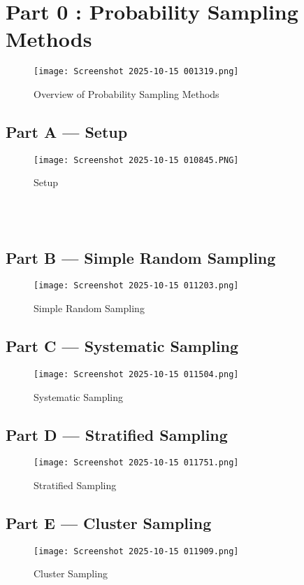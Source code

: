 \documentclass[12pt,a4paper]{article}
\begin{document}
\newpage
\section{Part 0 : Probability Sampling Methods}

\begin{figure}[H]
  \centering
  \texttt{[image: Screenshot 2025-10-15 001319.png]}
  \caption{Overview of Probability Sampling Methods}
  \label{fig:prob_sampling}
  \end{figure}


\subsection*{Part A --- Setup}
\begin{figure}[H]
  \centering
  \texttt{[image: Screenshot 2025-10-15 010845.PNG]}
  \caption{Setup}
\end{figure}


\\\\


\subsection*{Part B --- Simple Random Sampling}
\begin{figure}[H]
  \centering
  \texttt{[image: Screenshot 2025-10-15 011203.png]}
  \caption{Simple Random Sampling}
\end{figure}

\subsection*{Part C --- Systematic Sampling}
\begin{figure}[H]
  \centering
  \texttt{[image: Screenshot 2025-10-15 011504.png]}
  \caption{Systematic Sampling}
\end{figure}

\subsection*{Part D --- Stratified Sampling}
\begin{figure}[H]
  \centering
  \texttt{[image: Screenshot 2025-10-15 011751.png]}
  \caption{Stratified Sampling}
\end{figure}

\subsection*{Part E --- Cluster Sampling}
\begin{figure}[H]
  \centering
  \texttt{[image: Screenshot 2025-10-15 011909.png]}
  \caption{Cluster Sampling}
\end{figure}
\end{document}
